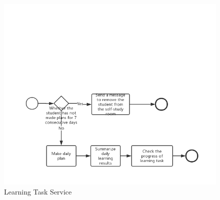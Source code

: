 \documentclass[runningheads]{llncs}
\begin{document}
	\begin{figure}
		\centering %
		\includegraphics[width=1.0\textwidth]{figure/llt/learningtaskservice} %
		\caption{Learning Task Service} %
		\label{learningtaskservice} %
	\end{figure}
\end{document}
